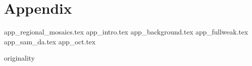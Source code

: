 \documentclass[
    10pt,
	colorful,
	boxey,
 a4paper,
]{tufte-style-thesis}
\begin{document}
\part*{Appendix}
\appendix

\setcounter{table}{0}
\setcounter{figure}{0}
\setcounter{section}{0}
\setcounter{chapter}{0}

\renewcommand{\thetable}{\thesection.\arabic{table}}
\renewcommand{\thefigure}{\thesection.\arabic{figure}}

{app_regional_mosaics.tex}
{app_intro.tex}
{app_background.tex}
{app_fullweak.tex}
{app_sam_da.tex}
{app_oct.tex}

\cleardoublepage


\thispagestyle{empty}
{originality}
\cleardoublepage

\end{document}
